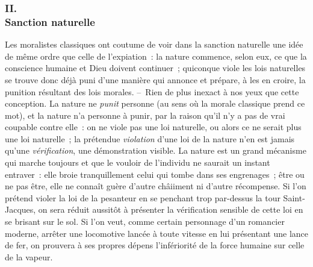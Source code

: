 \documentclass[french,twoside]{book} %
\begin{document}
\subsubsection[{II. Sanction naturelle}]{II. \\
Sanction naturelle}
\noindent Les moralistes classiques ont coutume de voir dans la sanction naturelle une idée de même ordre que celle de l’expiation : la nature commence, selon eux, ce que la conscience humaine et Dieu doivent continuer ; quiconque viole les lois naturelles se trouve donc déjà puni d’une manière qui annonce et prépare, à les en croire, la punition résultant des lois morales. – Rien de plus inexact à nos yeux que cette conception. La nature ne \emph{punit} personne (au sens où la morale classique prend ce mot), et la nature n’a personne à punir, par la raison qu’il n’y a pas de vrai coupable contre elle : on ne viole pas une loi naturelle, ou alors ce ne serait plus une loi naturelle ; la prétendue \emph{violation} d’une loi de la nature n’en est jamais qu’une \emph{vérification}, une démonstration visible. La nature est un grand mécanisme qui marche toujours et que le vouloir de l’individu ne saurait un instant entraver : elle broie tranquillement celui qui tombe dans ses engrenages ; être ou ne pas être, elle ne connaît guère d’autre châiiment ni d’autre récompense. Si l’on prétend violer la loi de la pesanteur en se penchant trop par-dessus la tour Saint-Jacques, on sera réduit aussitôt à présenter la vérification sensible de cette loi en se brisant sur le sol. Si l’on veut, comme certain personnage d’un romancier moderne, arrêter une locomotive lancée à toute vitesse en lui présentant une lance de fer, on prouvera à ses propres dépens l’infériorité de la force humaine sur celle de la vapeur.\par
\end{document}
